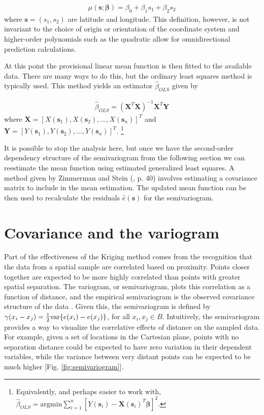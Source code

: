 \documentclass[12pt,twoside]{reedthesis}
\begin{document}
\begin{align*}
\mu(\mathbf{s}; \boldsymbol{\beta}) = \beta_0 + \beta_1s_1 + \beta_2s_2
\end{align*} 
where $\mathbf{s} = (s_1, s_2)$ are latitude and longitude. This definition, however, is not invariant to the choice of origin or orientation of the coordinate system \cite{gelfand:2010} and higher-order polynomials such as the quadratic allow for omnidirectional prediction calculations.


At this point the provisional linear mean function is then fitted to the available data. There are many ways to do this, but the ordinary least squares method is typically used. This method yields an estimator $\hat\beta_{OLS}$ given by 

\begin{align*}
\hat\beta_{OLS} = (\mathbf{X}^T\mathbf{X})^{-1}\mathbf{X}^T\mathbf{Y} 
\end{align*} 
where $\mathbf{X} = [X(\mathbf{s}_1), X(\mathbf{s}_2), \dots, X(\mathbf{s}_n)]^T$ and $\mathbf{Y} = [Y(\mathbf{s}_1), Y(\mathbf{s}_2), \dots, Y(\mathbf{s}_n)]^T$. \footnote{Equivalently, and perhaps easier to work with, $\hat\beta_{OLS} = \text{argmin}\sum_{i=1}^n[Y(\mathbf{s}_i) - \mathbf{X}(\mathbf{s}_i)^T\mathbf{\beta}]^2$.} 

It is possible to stop the analysis here, but once we have the second-order dependency structure of the semivariogram from the following section we can reestimate the mean function using estimated generalized least squares. A method given by Zimmerman and Stein (\cite{gelfand:2010}, p. 40) involves estimating a covariance matrix to include in the mean estimation. The updated mean function can be then used to recalculate the residuals $\hat e(\mathbf{s})$ for the semivariogram.


\section{Covariance and the variogram}
Part of the effectiveness of the Kriging method comes from the recognition that the data from a spatial sample are correlated based on proximity. Points closer together are expected to be more highly correlated than points with greater spatial separation. The variogram, or semivariogram, plots this correlation as a function of distance, and the empirical semivariogram is the observed covariance structure of the data \cite{gelfand:2010}. Given this, the semivariogram is defined by $\gamma(x_i - x_j) = {1\over 2} \text{var} \{ e(x_i) - e(x_j) \}$, for all $x_i, x_j \in B$. Intuitively, the semivariogram provides a way to visualize the correlative effects of distance on the sampled data. For example, given a set of locations in the Cartesian plane, points with no separation distance could be expected to have zero variation in their dependent variables, while the variance between very distant points can be expected to be much higher [Fig. \ref{fig:semivariogram}]. 
\end{document}
